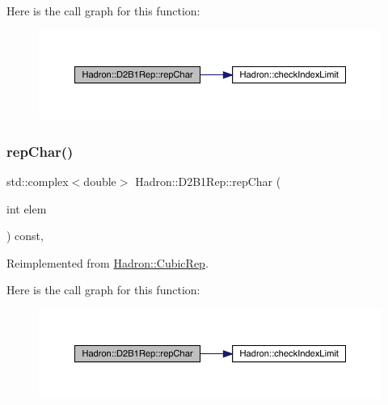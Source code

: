 Here is the call graph for this function\+:
\nopagebreak
\begin{figure}[H]
\begin{center}
\leavevmode
\includegraphics[width=350pt]{d1/d67/structHadron_1_1D2B1Rep_a306ddfcdbe8144f7f602a2814810cc7f_cgraph}
\end{center}
\end{figure}
\mbox{\label{structHadron_1_1D2B1Rep_a306ddfcdbe8144f7f602a2814810cc7f}} 
\subsubsection{\texorpdfstring{repChar()}{repChar()}\hspace{0.1cm}{\footnotesize\ttfamily [2/2]}}
{\footnotesize\ttfamily std\+::complex$<$double$>$ Hadron\+::\+D2\+B1\+Rep\+::rep\+Char (\begin{DoxyParamCaption}\item[{int}]{elem }\end{DoxyParamCaption}) const\hspace{0.3cm}{\ttfamily [inline]}, {\ttfamily [virtual]}}



Reimplemented from \mbox{\hyperlink{structHadron_1_1CubicRep_af45227106e8e715e84b0af69cd3b36f8}{Hadron\+::\+Cubic\+Rep}}.

Here is the call graph for this function\+:
\nopagebreak
\begin{figure}[H]
\begin{center}
\leavevmode
\includegraphics[width=350pt]{d1/d67/structHadron_1_1D2B1Rep_a306ddfcdbe8144f7f602a2814810cc7f_cgraph}
\end{center}
\end{figure}
\mbox{\label{structHadron_1_1D2B1Rep_a3d7f68800d29238030406bf06553360f}} 
